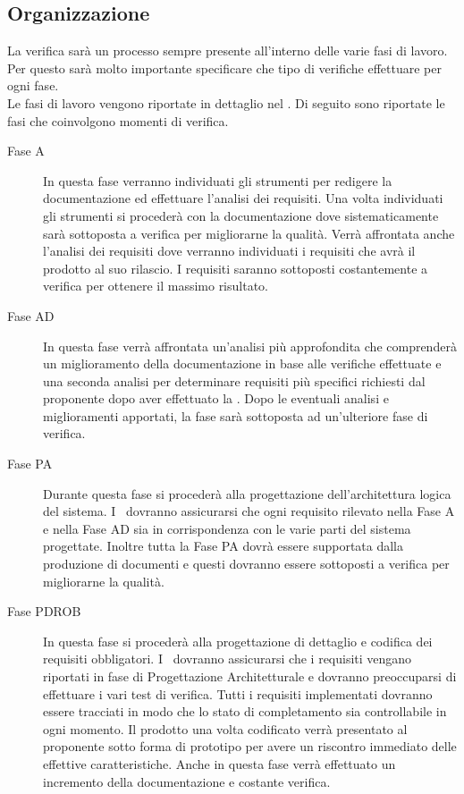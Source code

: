 \documentclass[../PianoDiQualifica.tex]{subfiles}
\begin{document}
		\subsection{Organizzazione}
		 La verifica sarà un processo sempre presente all'interno delle varie fasi di lavoro. Per questo sarà molto importante specificare che tipo di verifiche effettuare per ogni fase.
\\Le fasi di lavoro vengono riportate in dettaglio nel \pianodiprogettov. Di seguito sono riportate le fasi che coinvolgono momenti di verifica.
		 \begin{description}
		 	\item[Fase A] In questa fase verranno individuati gli strumenti per redigere la documentazione ed effettuare l'analisi dei requisiti. Una volta individuati gli strumenti si procederà con la documentazione dove sistematicamente sarà sottoposta a verifica per migliorarne la qualità. Verrà affrontata anche l'analisi dei requisiti dove verranno individuati i requisiti che avrà il prodotto al suo rilascio. I requisiti saranno sottoposti costantemente a verifica per ottenere il massimo risultato.
		 	\item[Fase AD] In questa fase verrà affrontata un'analisi più approfondita che comprenderà un miglioramento della documentazione in base alle verifiche effettuate e una seconda analisi per determinare requisiti più specifici richiesti dal proponente dopo aver effettuato la \revisionedeirequisiti. Dopo le eventuali analisi e miglioramenti apportati, la fase sarà sottoposta ad un'ulteriore fase di verifica.
			\item[Fase PA] Durante questa fase si procederà alla progettazione dell'architettura logica del sistema. I \verificatori\ dovranno assicurarsi che ogni requisito rilevato nella Fase A e nella Fase AD sia in corrispondenza con le varie parti del sistema progettate. Inoltre tutta la Fase PA dovrà essere supportata dalla produzione di documenti e questi dovranno essere sottoposti a verifica per migliorarne la qualità.
		 	\item[Fase PDROB] In questa fase si procederà alla progettazione di dettaglio e codifica dei requisiti obbligatori. I \verificatori\ dovranno assicurarsi che i requisiti vengano riportati in fase di Progettazione Architetturale e dovranno preoccuparsi di effettuare i vari test di verifica. Tutti i requisiti implementati dovranno essere tracciati in modo che lo stato di completamento sia controllabile in ogni momento. Il prodotto una volta codificato verrà presentato al proponente sotto forma di prototipo per avere un riscontro immediato delle effettive caratteristiche. Anche in questa fase verrà effettuato un incremento della documentazione e costante verifica.  

\end{description}
\end{document}

